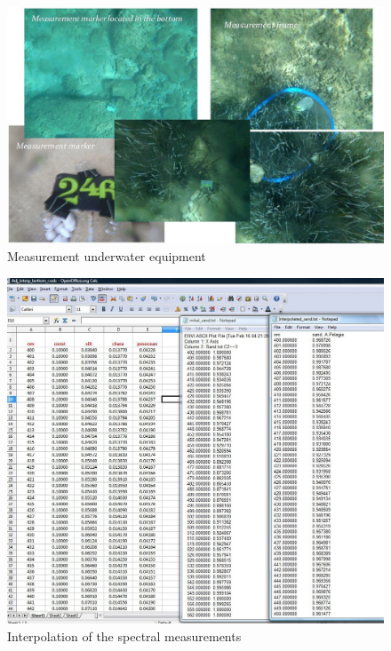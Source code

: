 \documentclass[10pt, a4paper]{article}
\begin{document}
\begin{appendices}
\begin{figure}[h]
	\begin{center}
		\includegraphics[scale=0.35]{Fig-3-16.jpg}
		\caption{Measurement underwater equipment}
		\label{fig:74}
	\end{center}
\end{figure}
\pagebreak


\begin{figure}[H]
	\begin{center}
		\includegraphics[scale=0.30]{Interpolation.jpg}
		\caption{Interpolation of the spectral measurements}
		\label{fig:75}
	\end{center}
\end{figure}


\end{appendices}
\end{document}
